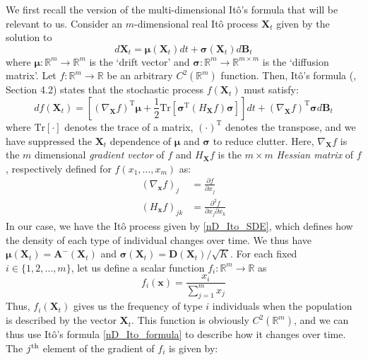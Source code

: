We first recall the version of the multi-dimensional It\^{o}'s formula that will be relevant to us. Consider an $m$-dimensional real It\^{o} process $\mathbf{X}_t$ given by the solution to
\begin{equation*}
d\mathbf{X}_t = \boldsymbol{\mu}(\mathbf{X}_t)dt + \boldsymbol{\sigma}(\mathbf{X}_t)d\mathbf{B}_t
\end{equation*}
where $\boldsymbol{\mu}: \mathbb{R}^m \to \mathbb{R}^m$ is the `drift vector' and $\boldsymbol{\sigma}: \mathbb{R}^{m} \to \mathbb{R}^{m \times m}$ is the `diffusion matrix'. Let $f: \mathbb{R}^m \to \mathbb{R}$ be an arbitrary $C^2(\mathbb{R}^m)$ function. Then, It\^{o}'s formula (\cite{oksendal_stochastic_1998}, Section 4.2) states that  the stochastic process $f(\mathbf{X}_t)$ must satisfy:
\begin{equation}
\label{nD_Ito_formula}
df(\mathbf{X}_t) = \left[\left(\nabla_{\mathbf{X}}f\right)^{\mathrm{T}}\boldsymbol{\mu} + \frac{1}{2}\mathrm{Tr}[\boldsymbol{\sigma}^{\mathrm{T}}(H_{\mathbf{X}}f)\boldsymbol{\sigma}]\right]dt + \left(\nabla_{\mathbf{X}}f\right)^{\mathrm{T}}\boldsymbol{\sigma}d\mathbf{B}_t
\end{equation}
where $\mathrm{Tr}[\cdot]$ denotes the trace of a matrix, $\left(\cdot\right)^{\mathrm{T}}$ denotes the transpose, and we have suppressed the $\mathbf{X}_t$ dependence of $\boldsymbol{\mu}$ and $\boldsymbol{\sigma}$ to reduce clutter. Here, $\nabla_{\mathbf{X}}f$ is the $m$ dimensional \emph{gradient vector} of $f$ and $H_{\mathbf{X}}f$ is the $m \times m$ \emph{Hessian matrix} of $f$, respectively defined for $f(x_1,\ldots,x_m)$ as:
\begin{align*}
\left(\nabla_{\mathbf{x}} f\right)_j &= \frac{\partial f}{\partial x_j}\\
\left(H_{\mathbf{x}} f\right)_{jk} &= \frac{\partial^2 f}{\partial x_j \partial x_k } 
\end{align*}
In our case, we have the It\^{o} process given by \eqref{nD_Ito_SDE}, which defines how the density of each type of individual changes over time. We thus have $\boldsymbol{\mu}(\mathbf{X}_t) = \mathbf{A}^{-}(\mathbf{X}_t)$ and $\boldsymbol{\sigma}(\mathbf{X}_t) = \mathbf{D}(\mathbf{X}_t)/\sqrt{K}$.  For each fixed $i \in \{1,2,\ldots,m\}$, let us define a scalar function $f_i: \mathbb{R}^m \to \mathbb{R}$ as
\begin{equation*}
f_i(\mathbf{x}) = \frac{x_i}{\sum\limits_{j=1}^{m}x_j}
\end{equation*}
Thus, $f_i(\mathbf{X}_t)$ gives us the frequency of type $i$ individuals when the population is described by the vector $\mathbf{X}_t$. This function is obviously $C^2(\mathbb{R}^m)$, and we can thus use It\^{o}'s formula \eqref{nD_Ito_formula} to describe how it changes over time. The $j\textsuperscript{th}$ element of the gradient of $f_i$ is given by:
